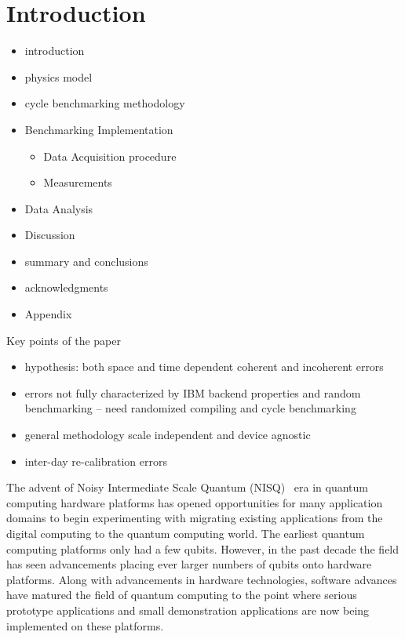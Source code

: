 

\section{Introduction}
\label{sec:intro}

\begin{itemize}
    \item introduction
\item physics model
\item cycle benchmarking methodology
\item Benchmarking Implementation
\begin{itemize}
    \item Data Acquisition procedure
    \item Measurements
\end{itemize}
\item Data Analysis
\item Discussion
\item summary and conclusions
\item acknowledgments
\item Appendix
\end{itemize}



Key points of the paper
\begin{itemize}
\item hypothesis: both space and time dependent coherent and incoherent errors
\item 	errors not fully characterized by IBM backend properties and random benchmarking – need randomized compiling and cycle benchmarking
\item  general methodology scale independent and device agnostic
\item inter-day re-calibration errors 
\end{itemize}

The advent of Noisy Intermediate Scale Quantum (NISQ)~\cite{Preskill2018quantumcomputingin} era in quantum computing hardware platforms has opened opportunities for many application domains to begin experimenting with migrating existing applications from the digital computing to the quantum computing world.  The earliest quantum computing platforms only had a few qubits.  However, in the past decade the field has seen advancements placing ever larger numbers of qubits onto hardware platforms.  Along with advancements in hardware technologies, software advances have matured the field of quantum computing to the point where serious prototype applications and small demonstration applications are now being implemented on these platforms.  


